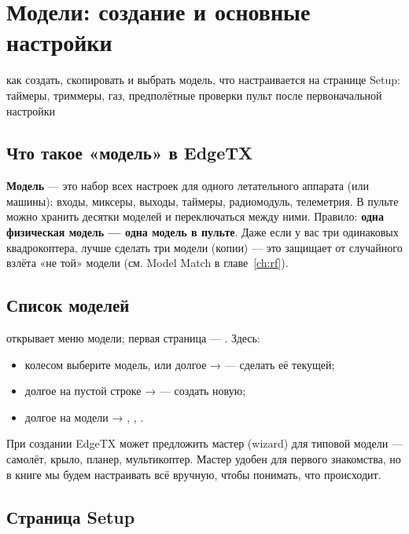 \chapter{Модели: создание и основные настройки}
\chapterintro
  {как создать, скопировать и выбрать модель, что настраивается на странице Setup: таймеры,
   триммеры, газ, предполётные проверки}
  {пульт после первоначальной настройки}

\section{Что такое «модель» в EdgeTX}

\textbf{Модель} --- это набор всех настроек для одного летательного аппарата (или машины):
входы, миксеры, выходы, таймеры, радиомодуль, телеметрия. В пульте можно хранить десятки
моделей и переключаться между ними. Правило: \textbf{одна физическая модель --- одна модель
в пульте}. Даже если у вас три одинаковых квадрокоптера, лучше сделать три модели (копии) ---
это защищает от случайного взлёта «не той» модели (см. Model Match в главе~\ref{ch:rf}).

\section{Список моделей}

 открывает меню модели; первая страница --- . Здесь:
\begin{itemize}
  \item колесом выберите модель,  или долгое  →  ---
        сделать её текущей;
  \item долгое  на пустой строке →  --- создать новую;
  \item долгое  на модели → , ,
        .
\end{itemize}

При создании EdgeTX может предложить мастер (wizard) для типовой модели --- самолёт, крыло,
планер, мультикоптер. Мастер удобен для первого знакомства, но в книге мы будем настраивать
всё вручную, чтобы понимать, что происходит.

\section{Страница Setup}

